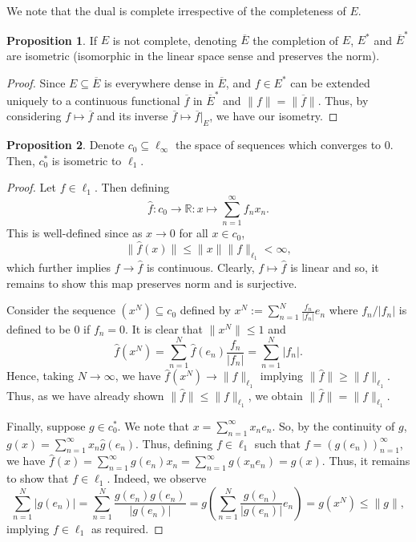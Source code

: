 \documentclass[]{article}
\theoremstyle{definition}
\theoremstyle{definition}
\newtheorem{proposition}{Proposition}[section]
\begin{document}
We note that the dual is complete irrespective of the completeness of \(E\). 

\begin{proposition}
  If \(E\) is not complete, denoting \(\overline{E}\) the 
  completion of \(E\), \(E^*\) and \(\overline{E}^*\) are isometric 
  (isomorphic in the linear space sense and preserves the norm). 
\end{proposition}
\begin{proof}
  Since \(E \subseteq \overline{E}\) is everywhere dense in \(\overline{E}\), 
  and \(f \in E^*\) can be extended uniquely to a continuous functional 
  \(\overline{f}\) in \(\overline{E}^*\) and \(\|f\| = \|\overline{f}\|\). 
  Thus, by considering \(f \mapsto \overline{f}\) and its inverse 
  \(\overline{f} \mapsto \overline{f}|_E\), we have our isometry.
\end{proof}

\begin{proposition}
  Denote \(c_0 \subseteq \ell_\infty\) the space of sequences which converges 
  to 0. Then, \(c_0^*\) is isometric to \(\ell_1\).
\end{proposition}
\begin{proof}
  Let \(f \in \ell_1\). Then defining 
  \[\hat f : c_0 \to \mathbb{R} : x \mapsto \sum_{n = 1}^\infty f_n x_n.\]
  This is well-defined since as \(x \to 0\) for all \(x \in c_0\), 
  \[\|\hat f(x)\| \le \|x\| \|f\|_{\ell_1} < \infty,\]
  which further implies \(f \to \hat f\) is continuous.
  Clearly, \(f \mapsto \hat f\) is linear and so, it remains to show this 
  map preserves norm and is surjective. 

  Consider the sequence \((x^N) \subseteq c_0\) defined by 
  \(x^N := \sum_{n = 1}^N \frac{f_n}{|f_n|} e_n\) where \(f_n / |f_n|\) is 
  defined to be 0 if \(f_n = 0\). It is clear that \(\|x^N\| \le 1\) and 
  \[\hat f(x^N) = \sum_{n = 1}^N \hat f(e_n) \frac{f_n}{|f_n|} = \sum_{n = 1}^N|f_n|.\]
  Hence, taking \(N \to \infty\), we have \(\hat f(x^N) \to \|f\|_{\ell_1}\) 
  implying \(\|\hat f\| \ge \|f\|_{\ell_1}\). Thus, as we have already shown 
  \(\|\hat f\| \le \|f\|_{\ell_1}\), we obtain \(\|\hat f\| = \|f\|_{\ell_1}\).

  Finally, suppose \(g \in c_0^*\). We note that \(x = \sum_{n = 1}^\infty x_n e_n\).
  So, by the continuity of \(g\), \(g(x) = \sum_{n = 1}^\infty x_n \hat g(e_n)\).
  Thus, defining \(f \in \ell_1\) such that \(f = (g(e_n))_{n = 1}^\infty\), 
  we have \(\hat f(x) = \sum_{n = 1}^\infty g(e_n) x_n
  = \sum_{n = 1}^\infty g(x_n e_n) = g(x)\). Thus, it remains to show that 
  \(f \in \ell_1\). Indeed, we observe 
  \[\sum_{n = 1}^N |g(e_n)| = 
    \sum_{n = 1}^N \frac{g(e_n) g(e_n)}{|g(e_n)|}
    = g\left(\sum_{n = 1}^N \frac{g(e_n)}{|g(e_n)|}e_n\right) 
    = g(x^N) \le \|g\|,\]
  implying \(f \in \ell_1\) as required.
\end{proof}
\end{document}

